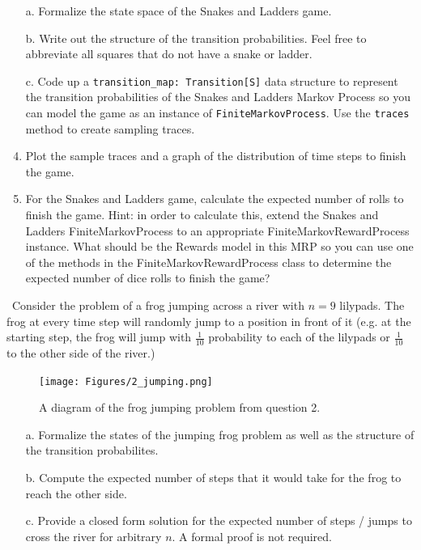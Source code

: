 \documentclass[12pt]{exam}
\begin{document}
\begin{questions}
\begin{enumerate}
	\item[a.] Formalize the state space of the Snakes and Ladders game.
	\item[b.] Write out the structure of the transition probabilities. Feel free to abbreviate all squares that do not have a snake or ladder.
	\item[c.] Code up a \lstinline{transition_map: Transition[S]} data structure to represent the transition probabilities of the Snakes and Ladders Markov Process so you can model the game as an instance of \lstinline{FiniteMarkovProcess}. Use the \lstinline{traces} method to create sampling traces.
	\item[d.] Plot the sample traces and a graph of the distribution of time steps to finish the game.
	\item[e.] For the Snakes and Ladders game, calculate the expected number of rolls to finish the game. Hint: in order to calculate this, extend the Snakes and Ladders FiniteMarkovProcess to an appropriate FiniteMarkovRewardProcess instance. What should be the Rewards model in this MRP so you can use one of the methods in the FiniteMarkovRewardProcess class to determine the expected number of dice rolls to finish the game?
\end{enumerate}
\
\question Consider the problem of a frog jumping across a river with $n=9$ lilypads. The frog at every time step will randomly jump to a position in front of it (e.g. at the starting step, the frog will jump with $\frac{1}{10}$ probability to each of the lilypads or $\frac{1}{10}$ to the other side of the river.)
\begin{figure}
	\begin{center}
		\texttt{[image: Figures/2\_jumping.png]}
	\end{center}
	\caption{A diagram of the frog jumping problem from question 2. }
\end{figure}
\begin{enumerate}
	\item[a.] Formalize the states of the jumping frog problem as well as the structure of the transition probabilites.
	\item[b.] Compute the expected number of steps that it would take for the frog to reach the other side.
	\item[c.] Provide a closed form solution for the expected number of steps / jumps to cross the river for arbitrary $n$. A formal proof is not required. 
\end{enumerate}


\end{questions}
\end{document}
